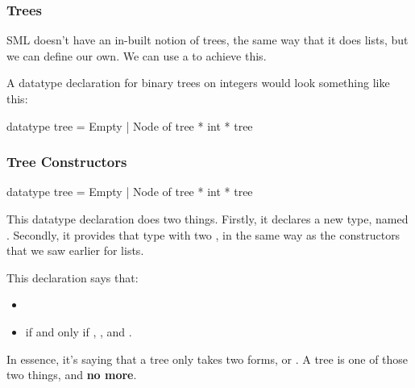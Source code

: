 \documentclass[aspectratio=169, handout]{beamer}
\begin{document}
\begin{frame}[fragile]
  \frametitle{Trees}

  SML doesn't have an in-built notion of trees, the same way that it does lists, but we can
  define our own. We can use a  to achieve this.

  \pause
  \vspace{\fill}


  \pause
  \vspace{\fill}

  A datatype declaration for binary trees on integers would look something like this:
  \begin{codeblock}
    datatype tree = Empty | Node of tree * int * tree
  \end{codeblock}
\end{frame}

\begin{frame}[fragile]
  \frametitle{Tree Constructors}

  \begin{codeblock}
    datatype tree = Empty | Node of tree * int * tree
  \end{codeblock}

  \vspace{\fill}

  This datatype declaration does two things. Firstly, it declares a new type, named .
  Secondly, it provides that type with two , in the same way as the constructors
  that we saw earlier for lists.

  \pause
  \vspace{\fill}

  This declaration says that:
  \pause
  \begin{itemize}
    \item {} \pause
    \item {} if and only if , , and . \pause
  \end{itemize}

  \vspace{\fill}

  In essence, it's saying that a tree only takes two forms,  or . A tree
  is one of those two things, and \textbf{no more}.
\end{frame}
\end{document}

